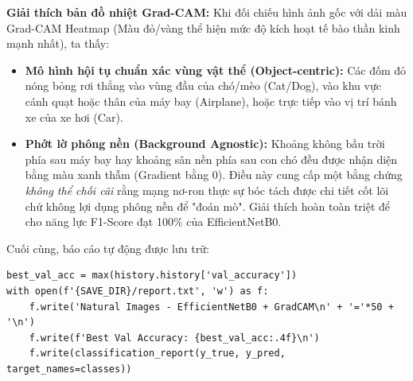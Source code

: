 \textbf{Giải thích bản đồ nhiệt Grad-CAM:}
Khi đối chiếu hình ảnh gốc với dải màu Grad-CAM Heatmap (Màu đỏ/vàng thể hiện mức độ kích hoạt tế bào thần kinh mạnh nhất), ta thấy:
\begin{itemize}
    \item \textbf{Mô hình hội tụ chuẩn xác vùng vật thể (Object-centric):} Các đốm đỏ nóng bỏng rơi thẳng vào vùng đầu của chó/mèo (Cat/Dog), vào khu vực cánh quạt hoặc thân của máy bay (Airplane), hoặc trực tiếp vào vị trí bánh xe của xe hơi (Car).
    \item \textbf{Phớt lờ phông nền (Background Agnostic):} Khoảng không bầu trời phía sau máy bay hay khoảng sân nền phía sau con chó đều được nhận diện bằng màu xanh thẫm (Gradient bằng 0). Điều này cung cấp một bằng chứng \textit{không thể chối cãi} rằng mạng nơ-ron thực sự bóc tách được chi tiết cốt lõi chứ không lợi dụng phông nền để "đoán mò". Giải thích hoàn toàn triệt để cho năng lực F1-Score đạt 100\% của EfficientNetB0.
\end{itemize}

Cuối cùng, báo cáo tự động được lưu trữ:
\begin{lstlisting}[style=pythoncode, caption={Lưu báo cáo vào tập tin hệ thống}]
best_val_acc = max(history.history['val_accuracy'])
with open(f'{SAVE_DIR}/report.txt', 'w') as f:
    f.write('Natural Images - EfficientNetB0 + GradCAM\n' + '='*50 + '\n')
    f.write(f'Best Val Accuracy: {best_val_acc:.4f}\n')
    f.write(classification_report(y_true, y_pred, target_names=classes))
\end{lstlisting}
